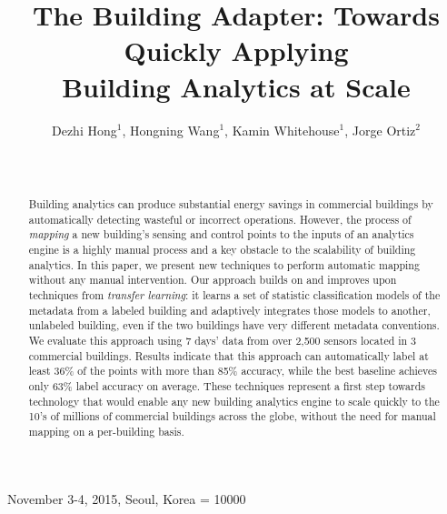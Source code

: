 \documentclass{acm_proc_article-sp}
\begin{document}
 {November 3-4, 2015, Seoul, Korea}
\widowpenalty = 10000

\title{The Building Adapter: Towards Quickly Applying\\ Building Analytics at Scale}

\author{
\alignauthor
Dezhi Hong$^1$,  Hongning Wang$^1$,  Kamin Whitehouse$^1$, Jorge Ortiz$^2$\\
	\\
	\\
}

\maketitle
\begin{abstract}
Building analytics can produce substantial energy savings in commercial
buildings by automatically detecting wasteful or incorrect operations.  However,
the process of {\em mapping} a new building's sensing and
control points to the inputs of an analytics engine
is a highly manual process and a key obstacle to the scalability of building
analytics. In this paper, we present new techniques to perform automatic
mapping without any manual intervention. Our approach builds on and improves
upon techniques from {\em transfer learning}: it learns a set of statistic classification models of the metadata
from a labeled building and adaptively integrates those models to another,
unlabeled building, even if the two buildings have very different metadata conventions. We evaluate
this approach using 7 days' data from over 2,500 sensors located in 3
commercial buildings. Results indicate that this approach can automatically
label at least 36\% of the points with more than 85\% accuracy, while the
best baseline achieves only 63\% label accuracy on average. These techniques
represent a first step towards technology that would enable any new building
analytics engine to scale quickly to the 10's of millions of commercial
buildings across the globe, without the need for manual mapping on a
per-building basis.
\end{abstract}
\end{document}
